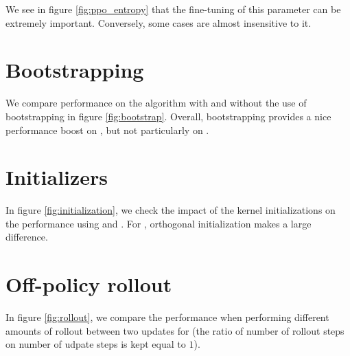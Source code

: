 We see in figure \ref{fig:ppo_entropy} that the fine-tuning of this parameter can be extremely important. Conversely, some cases are almost insensitive to it.



\section{Bootstrapping}

We compare performance on the \ppo algorithm with and without the use of bootstrapping in figure \ref{fig:bootstrap}. Overall, bootstrapping provides a nice performance boost on , but not particularly on .



\section{Initializers}

In figure \ref{fig:initialization}, we check the impact of the kernel initializations on the performance using \ppo and \sac. For \ppo, orthogonal initialization makes a large difference.



\section{Off-policy rollout}

In figure \ref{fig:rollout}, we compare the performance when performing different amounts of rollout between two updates for \sac (the ratio of number of rollout steps on number of udpate steps is kept equal to $1$).




